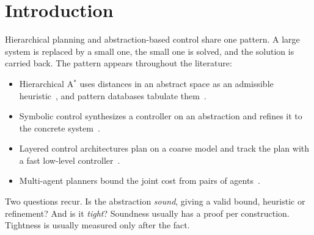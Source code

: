 \documentclass[11pt]{article}
\theoremstyle{definition}
\theoremstyle{remark}
\begin{document}
\section{Introduction}

Hierarchical planning and abstraction-based control share one pattern. A large
system is replaced by a small one, the small one is solved, and the solution is
carried back. The pattern appears throughout the literature:
\begin{itemize}[nosep]
\item Hierarchical A$^*$ uses distances in an abstract space as an admissible
  heuristic~\cite{holte1996}, and pattern databases tabulate
  them~\cite{culberson1998}.
\item Symbolic control synthesizes a controller on an abstraction and refines it
  to the concrete system~\cite{tabuada2009,reissig2017}.
\item Layered control architectures plan on a coarse model and track the plan with
  a fast low-level controller~\cite{matni2024}.
\item Multi-agent planners bound the joint cost from pairs of
  agents~\cite{felner2018,li2019}.
\end{itemize}
Two questions recur. Is the abstraction \emph{sound}, giving a valid bound,
heuristic or refinement? And is it \emph{tight}? Soundness usually has a proof
per construction. Tightness is usually measured only after the fact.
\end{document}
